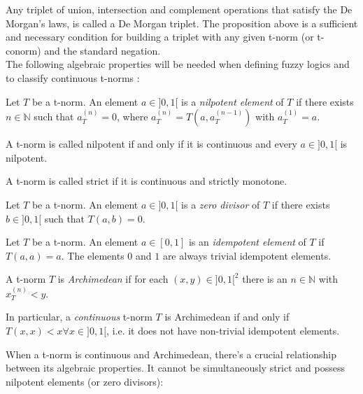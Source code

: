 Any triplet of union, intersection and complement operations that satisfy the De Morgan's laws, is called a De Morgan triplet\cite[p.~52]{HistoryFL2017}. The proposition above is a sufficient and necessary condition for building a triplet with any given t-norm (or t-conorm) and the standard negation.\\

The following algebraic properties will be needed when defining fuzzy logics and to classify continuous t-norms \cite[Def.~2.1 \& 2.13]{Klement2000}:

\begin{definition}
Let $T$ be a t-norm. An element $a \in ]0,1[$ is a \emph{nilpotent element} of $T$ if there exists $n \in \mathbb{N}$ such that $a_T^{(n)} = 0$, where $a_T^{(n)} = T(a, a_T^{(n-1)})$ with $a_T^{(1)}=a$.

A t-norm is called nilpotent if and only if it is continuous and every $a\in ]0,1[$ is nilpotent.
\end{definition}

\begin{definition}
  A t-norm is called strict if it is continuous and strictly monotone.
\end{definition}


\begin{definition}
Let $T$ be a t-norm. An element $a \in ]0,1[$ is a \emph{zero divisor} of $T$ if there exists $b \in ]0,1[$ such that $T(a,b)=0$.
\end{definition}

\begin{definition}
  Let $T$ be a t-norm. An element $a \in [0,1]$ is an \emph{idempotent element} of $T$ if $T(a,a)=a$. The elements $0$ and $1$ are always trivial idempotent elements.
  \end{definition}
  

\begin{definition}
A t-norm $T$ is \emph{Archimedean} if for each $(x,y) \in ]0,1[^2$ there is an $n \in \mathbb{N}$ with $x_T^{(n)} < y$. \cite[Def.~2.9]{Klement2000}  

In particular, a \textit{continuous} t-norm $T$ is Archimedean if and only if $T(x,x) < x \forall x \in ]0,1[$, i.e. it does not have non-trivial idempotent elements. \cite[Thm.~2.12]{Klement2000}
\end{definition}


When a t-norm is continuous and Archimedean, there's a crucial relationship between its algebraic properties. It cannot be simultaneously strict and possess nilpotent elements (or zero divisors):

